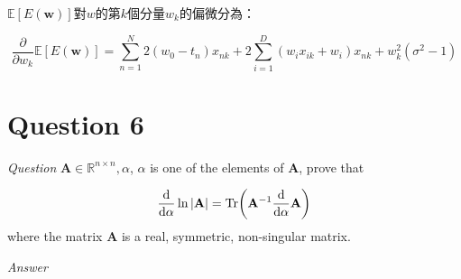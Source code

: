 \documentclass{article}
\begin{document}
$\mathbb E[E(\mathbf w)]$對$w$的第$k$個分量$w_k$的偏微分為：

\begin{equation}
\frac{\partial}{\partial w_k}\mathbb E[E(\mathbf w)] = \sum\limits_{n=1}^N 2(w_0-t_n)x_{nk}+2\sum\limits_{i=1}^D(w_i x_{ik} + w_i) x_{nk} + w_k^2 (\sigma^2-1)
\end{equation}

\section{Question 6}

\emph{Question} $\mathbf A \in \mathbb R^{n \times n}, \alpha$, $\alpha$ is one of the elements of $\mathbf A$, prove that

\begin{equation*}
\frac{\mathrm d}{\mathrm d \alpha }\ln|\mathbf A|= \rm Tr\bigg(\mathbf A^{-1}\frac{\mathrm d}{\mathrm d \alpha}\mathbf A \bigg)
\end{equation*}
where the matrix $\mathbf A$ is a real, symmetric, non-singular matrix.

\emph{Answer}
\end{document}

